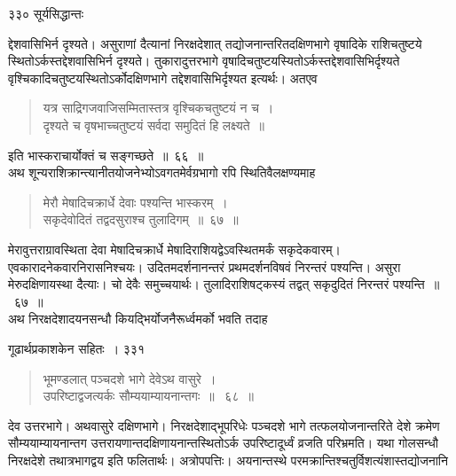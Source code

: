 \documentclass[11pt, openany]{book}
\begin{document}
\newpage

\noindent ३३० \hspace{4cm} सूर्यसिद्धान्तः
\vspace{1cm}


द्देशवासिभिर्न दृश्यते। असुराणां दैत्यानां निरक्षदेशात् तद्योजनान्तरितदक्षिणभागे वृषादिके राशिचतुष्टये स्थितोऽर्कस्तद्देशवासिभिर्न दृश्यते। तुकारादुत्तरभागे वृषादिचतुष्टयस्यितोऽर्कस्तद्देशवासिभिर्दृश्यते वृश्चिकादिचतुष्टयस्थितोऽर्कोदक्षिणभागे तद्देशवासिभिर्दृश्यत इत्यर्थः। अतएव \textendash

 \begin{quote}
{\qt यत्र साद्रिगजवाजिसम्मितास्तत्र वृश्चिकचतुष्टयं न च~।\\
 दृश्यते च वृषभाच्चतुष्टयं सर्वदा समुदितं हि लक्ष्यते~॥~}
\end{quote}
इति भास्कराचार्योक्तं च सङ्गच्छते~॥~६६~॥\\
\noindent अथ शून्यराशिक्रान्त्यानीतयोजनेभ्योऽवगतमेर्वग्रभागो रपि स्थितिवैलक्षण्यमाह \textendash


 \begin{quote}
{\ssi मेरौ मेषादिचक्रार्धे देवाः पश्यन्ति भास्करम्~। \\
सकृदेवोदितं तद्वदसुराश्च तुलादिगम्~॥~६७~॥}
\end{quote}
 मेरावुत्तराग्रावस्थिता देवा मेषादिचक्रार्धे मेषादिराशियद्वेऽवस्थितमर्कं सकृदेकवारम्। एवकारादनेकवारनिरासनिश्चयः। उदितमदर्शनानन्तरं प्रथमदर्शनविषवं निरन्तरं पश्यन्ति। असुरा मेरुदक्षिणायस्था दैत्याः। चो देवैः समुच्चयार्थः। तुलादिराशिषट्कस्यं तद्वत् सकृदुदितं निरन्तरं पश्यन्ति~॥~६७~॥ \\
\noindent अथ निरक्षदेशादयनसन्धौ कियद्भिर्योजनैरूर्ध्वमर्को भवति तदाह \textendash



\newpage


\hspace{3cm} गूढार्थप्रकाशकेन सहितः~।  \hfill ३३१ 
\vspace{1cm}

%

 \begin{quote}
{\ssi भूमण्डलात् पञ्चदशे भागे देवेऽथ वासुरे~।\\
उपरिष्टाद्वजत्यर्कः सौम्ययाम्यायनान्तगः~॥~ ६८~॥}
\end{quote}
 देव उत्तरभागे। अथवासुरे दक्षिणभागे। निरक्षदेशाद्भूपरिधेः पञ्चदशे भागे तत्फलयोजनान्तरिते देशे क्रमेण सौम्ययाम्यायनान्तग उत्तरायणान्तदक्षिणायनान्तस्थितोऽर्क उपरिष्टादूर्ध्वं व्रजति परिभ्रमति। यथा गोलसन्धौ निरक्षदेशे तथात्रभागद्वय इति फलितार्थः। अत्रोपपत्तिः। अयनान्तस्थे परमक्रान्तिश्चतुर्विशत्यंशास्तद्योजनानि \textendash
\end{document}
